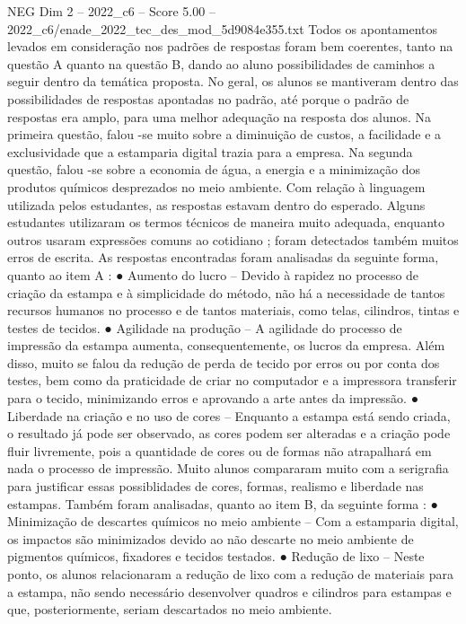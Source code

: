 \begin{textsample}{NEG Dim 2 – 2022\_c6 – Score 5.00 – 2022\_c6/enade\_2022\_tec\_des\_mod\_5d9084e355.txt}
Todos os apontamentos levados em consideração nos padrões de respostas foram bem coerentes, tanto na questão A quanto na questão B, dando ao aluno possibilidades de caminhos a seguir dentro da temática proposta.
No geral, os alunos se mantiveram dentro das possibilidades de respostas apontadas no padrão, até porque o padrão de respostas era amplo, para uma melhor adequação na resposta dos alunos.
Na primeira questão, falou -se muito sobre a diminuição de custos, a facilidade e a exclusividade que a estamparia digital trazia para a empresa.
Na segunda questão, falou -se sobre a economia de água, a energia e a minimização dos produtos químicos desprezados no meio ambiente.
Com relação à linguagem utilizada pelos estudantes, as respostas estavam dentro do esperado.
Alguns estudantes utilizaram os termos técnicos de maneira muito adequada, enquanto outros usaram expressões comuns ao cotidiano ; foram detectados também muitos erros de escrita.
As respostas encontradas foram analisadas da seguinte forma, quanto ao item A : {\EmojiFont ●} Aumento do lucro – Devido à rapidez no processo de criação da estampa e à simplicidade do método, não há a necessidade de tantos recursos humanos no processo e de tantos materiais, como telas, cilindros, tintas e testes de tecidos. {\EmojiFont ●} Agilidade na produção – A agilidade do processo de impressão da estampa aumenta, consequentemente, os lucros da empresa.
Além disso, muito se falou da redução de perda de tecido por erros ou por conta dos testes, bem como da praticidade de criar no computador e a impressora transferir para o tecido, minimizando erros e aprovando a arte antes da impressão. {\EmojiFont ●} Liberdade na criação e no uso de cores – Enquanto a estampa está sendo criada, o resultado já pode ser observado, as cores podem ser alteradas e a criação pode fluir livremente, pois a quantidade de cores ou de formas não atrapalhará em nada o processo de impressão.
Muito alunos compararam muito com a serigrafia para justificar essas possiblidades de cores, formas, realismo e liberdade nas estampas.
Também foram analisadas, quanto ao item B, da seguinte forma : {\EmojiFont ●} Minimização de descartes químicos no meio ambiente – Com a estamparia digital, os impactos são minimizados devido ao não descarte no meio ambiente de pigmentos químicos, fixadores e tecidos testados. {\EmojiFont ●} Redução de lixo – Neste ponto, os alunos relacionaram a redução de lixo com a redução de materiais para a estampa, não sendo necessário desenvolver quadros e cilindros para estampas e que, posteriormente, seriam descartados no meio ambiente.

\end{textsample}

